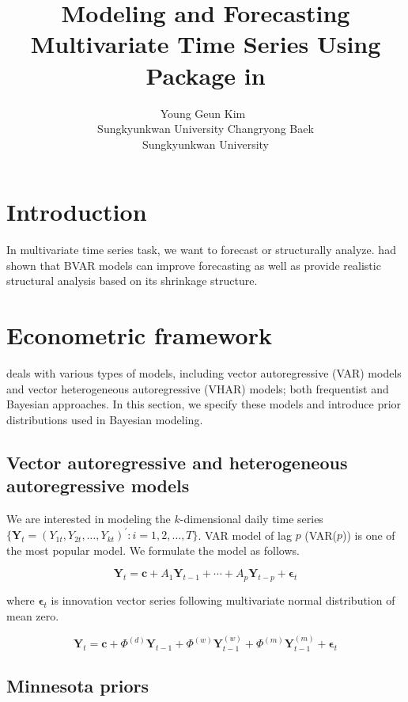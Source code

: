\documentclass[
]{jss}
\author{
Young Geun Kim~\orcidlink{0000-0001-8651-1167}\\Sungkyunkwan
University \And Changryong Baek\\Sungkyunkwan University
}
\title{Modeling and Forecasting Multivariate Time Series Using
\pkg{bvhar} Package in \proglang{R}}
\begin{document}
\section{Introduction}\label{introduction}

In multivariate time series task, we want to forecast or structurally
analyze. \citet{banbura2010} had shown that BVAR models can improve
forecasting as well as provide realistic structural analysis based on
its shrinkage structure.

\section{Econometric framework}\label{sec:econ}

 deals with various types of models, including vector
autoregressive (VAR) models and vector heterogeneous autoregressive
(VHAR) models; both frequentist and Bayesian approaches. In this
section, we specify these models and introduce prior distributions used
in Bayesian modeling.

\subsection[VHAR]{Vector autoregressive and heterogeneous autoregressive
models}\label{sec:vhar}

We are interested in modeling the \(k\)-dimensional daily time series
\(\{ {\mathbf Y}_t = (Y_{1t}, Y_{2t}, \ldots, Y_{kt})^\prime\colon i = 1, 2, \ldots, T \}\).
VAR model of lag \(p\) (VAR(\(p\))) is one of the most popular model. We
formulate the model as follows.

\begin{equation}
  {\mathbf Y}_t = {\mathbf c}+ A_1 {\mathbf Y}_{t - 1} + \cdots + A_p {\mathbf Y}_{t - p} + {\boldsymbol \epsilon}_t
  \label{eq:vareq}
\end{equation}

where \({\boldsymbol \epsilon}_t\) is innovation vector series following
multivariate normal distribution of mean zero.

\begin{equation}
  {\mathbf Y}_t = {\mathbf c}+ \Phi^{(d)} {\mathbf Y}_{t - 1} + \Phi^{(w)} {\mathbf Y}_{t - 1}^{(w)} + \Phi^{(m)} {\mathbf Y}_{t - 1}^{(m)} + {\boldsymbol \epsilon}_t
  \label{eq:vhareq}
\end{equation}

\subsection[minn]{Minnesota priors}\label{sec:minnesota}
\end{document}
